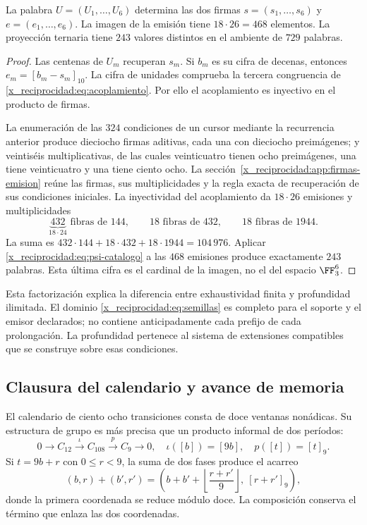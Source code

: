 \begin{proposition}
La palabra \(U=(U_1,\ldots,U_6)\) determina las dos firmas \(s=(s_1,\ldots,s_6)\) y \(e=(e_1,\ldots,e_6)\). La imagen de la emisión tiene \(18\cdot26=468\) elementos. La proyección ternaria tiene \(243\) valores distintos en el ambiente de \(729\) palabras.
\end{proposition}
\begin{proof}
Las centenas de \(U_m\) recuperan \(s_m\). Si \(b_m\) es su cifra de decenas, entonces \(e_m=[b_m-s_m]_{10}\). La cifra de unidades comprueba la tercera congruencia de \eqref{x_reciprocidad:eq:acoplamiento}. Por ello el acoplamiento es inyectivo en el producto de firmas.

La enumeración de las \(324\) condiciones de un cursor mediante la recurrencia anterior produce dieciocho firmas aditivas, cada una con dieciocho preimágenes; y veintiséis multiplicativas, de las cuales veinticuatro tienen ocho preimágenes, una tiene veinticuatro y una tiene ciento ocho. La sección~\ref{x_reciprocidad:app:firmas-emision} reúne las firmas, sus multiplicidades y la regla exacta de recuperación de sus condiciones iniciales. La inyectividad del acoplamiento da \(18\cdot26\) emisiones y multiplicidades
\[
 \underbrace{432}_{18\cdot24}\text{ fibras de }144,
 \qquad18\text{ fibras de }432,
 \qquad18\text{ fibras de }1944.
\]
La suma es \(432\cdot144+18\cdot432+18\cdot1944=104\,976\). Aplicar \eqref{x_reciprocidad:eq:psi-catalogo} a las \(468\) emisiones produce exactamente \(243\) palabras. Esta última cifra es el cardinal de la imagen, no el del espacio \(\FF_3^6\).
\end{proof}

Esta factorización explica la diferencia entre exhaustividad finita y profundidad ilimitada. El dominio \eqref{x_reciprocidad:eq:semillas} es completo para el soporte y el emisor declarados; no contiene anticipadamente cada prefijo de cada prolongación. La profundidad pertenece al sistema de extensiones compatibles que se construye sobre esas condiciones.

\subsection{Clausura del calendario y avance de memoria}

El calendario de ciento ocho transiciones consta de doce ventanas nonádicas. Su estructura de grupo es más precisa que un producto informal de dos períodos:
\begin{equation}
 0\longrightarrow C_{12}\xrightarrow{\iota}C_{108}
 \xrightarrow{p}C_9\longrightarrow0,
 \quad\iota([b])=[9b],\quad p([t])=[t]_9.
 \label{x_reciprocidad:eq:extension108}
\end{equation}
Si \(t=9b+r\) con \(0\le r<9\), la suma de dos fases produce el acarreo
\[
 (b,r)+(b',r')=
 \left(b+b'+\left\lfloor\frac{r+r'}9\right\rfloor,\ [r+r']_9\right),
\]
donde la primera coordenada se reduce módulo doce. La composición conserva el término que enlaza las dos coordenadas.


